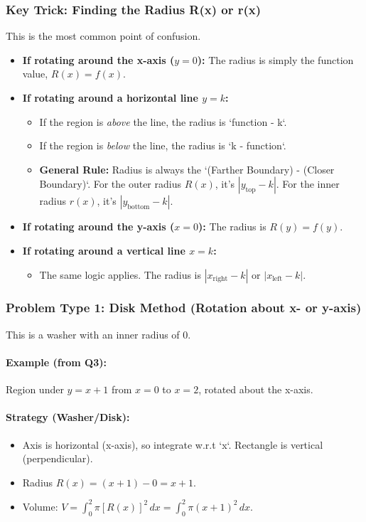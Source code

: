 \documentclass{article}
\begin{document}
\subsubsection*{Key Trick: Finding the Radius R(x) or r(x)}
This is the most common point of confusion.
\begin{itemize}
    \item \textbf{If rotating around the x-axis ($y=0$):} The radius is simply the function value, $R(x)=f(x)$.
    \item \textbf{If rotating around a horizontal line $y=k$:}
    \begin{itemize}
        \item If the region is \textit{above} the line, the radius is `function - k`.
        \item If the region is \textit{below} the line, the radius is `k - function`.
        \item \textbf{General Rule:} Radius is always the `(Farther Boundary) - (Closer Boundary)`. For the outer radius $R(x)$, it's $|y_{\text{top}} - k|$. For the inner radius $r(x)$, it's $|y_{\text{bottom}} - k|$.
    \end{itemize}
    \item \textbf{If rotating around the y-axis ($x=0$):} The radius is $R(y)=f(y)$.
    \item \textbf{If rotating around a vertical line $x=k$:}
    \begin{itemize}
        \item The same logic applies. The radius is $|x_{\text{right}} - k|$ or $|x_{\text{left}} - k|$.
    \end{itemize}
\end{itemize}

\subsubsection{Problem Type 1: Disk Method (Rotation about x- or y-axis)}
This is a washer with an inner radius of 0.
\paragraph{Example (from Q3):} Region under $y=x+1$ from $x=0$ to $x=2$, rotated about the x-axis.
\paragraph{Strategy (Washer/Disk):}
\begin{itemize}
    \item Axis is horizontal (x-axis), so integrate w.r.t `x`. Rectangle is vertical (perpendicular).
    \item Radius $R(x) = (x+1) - 0 = x+1$.
    \item Volume: $V = \int_0^2 \pi [R(x)]^2 \,dx = \int_0^2 \pi (x+1)^2 \,dx$.
\end{itemize}
\end{document}
